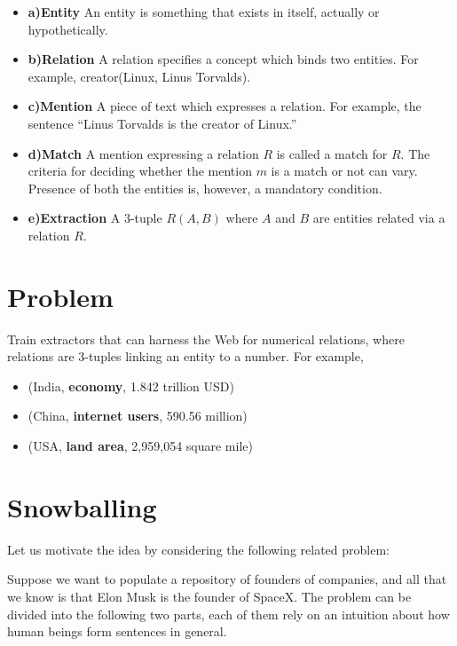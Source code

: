 \documentclass[a4paper,10pt]{article}
\begin{document}
\begin{itemize}

\item \textbf{a)Entity}
An entity is something that exists in itself, actually or hypothetically. \cite{wikientity}

\item \textbf{b)Relation}
A relation specifies a concept which binds two entities. For example, creator(Linux, Linus Torvalds).

\item \textbf{c)Mention}
 A piece of text which expresses a relation. For example, the sentence ``Linus Torvalds is the creator of Linux.''

\item \textbf{d)Match}
A mention expressing a relation $R$ is called a match for $R$. The criteria for deciding whether the mention $m$ is a match or not 
can vary. Presence of both the entities is, however, a mandatory condition.

\item \textbf{e)Extraction}
A 3-tuple $R(A, B)$ where $A$ and $B$ are entities related via a relation $R$.
\end{itemize}

\section{Problem}
Train extractors that can harness the Web for numerical relations, where relations are 3-tuples linking an entity
to a number. For example,
    \begin{itemize}
	\item  (India, \textbf{economy}, 1.842 trillion USD)
	\item  (China, \textbf{internet users},  590.56 million)
	\item  (USA, \textbf{land area}, 2,959,054 square mile)
    \end{itemize}

\section{Snowballing}
Let us motivate the idea by considering the following related problem:

Suppose we want to populate a repository of founders of companies, and all that we know
is that Elon Musk is the founder of SpaceX.
The problem can be divided into the following two parts, each of them rely on an intuition about how human 
beings form sentences in general.
\end{document}
